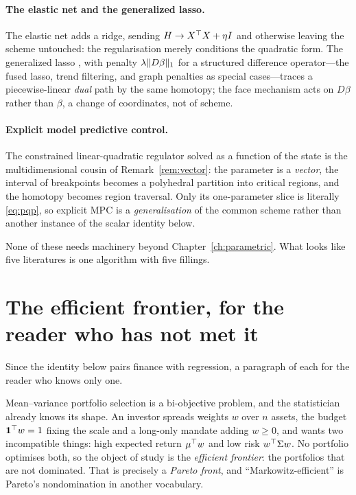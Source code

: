 \paragraph{The elastic net and the generalized lasso.} The elastic net
\cite{zou2005} adds a ridge, sending $H \to X^{\top} X + \eta I$ and otherwise leaving the
scheme untouched: the regularisation merely conditions the quadratic form. The
generalized lasso \cite{tibshirani2011}, with penalty $\lambda\lVert D\beta \rVert_1$ for a
structured difference operator---the fused lasso, trend filtering, and graph
penalties as special cases---traces a piecewise-linear \emph{dual} path by the same
homotopy; the face mechanism acts on $D\beta$ rather than $\beta$, a change of
coordinates, not of scheme.

\paragraph{Explicit model predictive control.} The constrained linear-quadratic
regulator solved as a function of the state \cite{bemporad2002,tondel2003} is the
multidimensional cousin of Remark~\ref{rem:vector}: the parameter is a
\emph{vector}, the interval of breakpoints becomes a polyhedral partition into
critical regions, and the homotopy becomes region traversal. Only its one-parameter
slice is literally \eqref{eq:pqp}, so explicit MPC is a \emph{generalisation} of the
common scheme rather than another instance of the scalar identity below.

\medskip
None of these needs machinery beyond Chapter~\ref{ch:parametric}. What looks like
five literatures is one algorithm with five fillings.

\section{The efficient frontier, for the reader who has not met it}
\label{sec:frontier-primer}

Since the identity below pairs finance with regression, a paragraph of each for the
reader who knows only one.

Mean--variance portfolio selection is a bi-objective problem, and the statistician
already knows its shape. An investor spreads weights $w$ over $n$ assets, the budget
$\mathbf{1}^{\top} w = 1$ fixing the scale and a long-only mandate adding $w \ge 0$, and
wants two incompatible things: high expected return $\mu^{\top} w$ and low risk
$w^{\top}\Sigma w$. No portfolio optimises both, so the object of study is the
\emph{efficient frontier}: the portfolios that are not dominated. That is precisely a
\emph{Pareto front}, and ``Markowitz-efficient'' is Pareto's nondomination in another
vocabulary.

